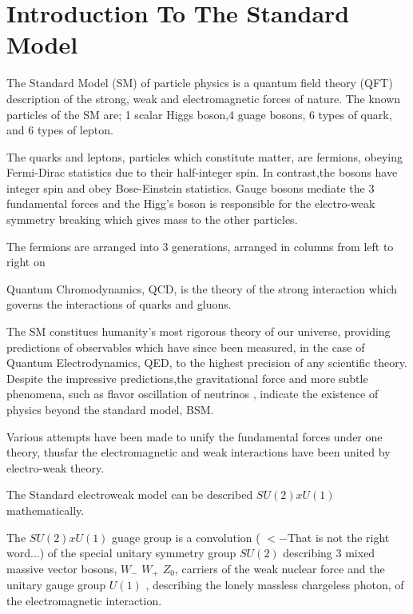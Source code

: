 \section{Introduction To The Standard Model}\label{secSM}



The Standard Model (SM) of particle physics is a quantum field theory (QFT) description of the strong, weak and electromagnetic forces of nature. The known particles of the SM are; 1 scalar Higgs boson,4 guage bosons, 6 types of quark, and 6 types of lepton. 

The quarks and leptons, particles which constitute matter, are fermions, obeying Fermi-Dirac statistics due to their half-integer spin. In contrast,the bosons have integer spin and obey Bose-Einstein statistics. Gauge bosons mediate the 3 fundamental forces and the Higg's boson is responsible for the electro-weak symmetry breaking which gives mass to the other particles\cite{Griffiths:111880}. 

The fermions are arranged into 3 generations, arranged in columns from left to right on \cite{fig:SM}



Quantum Chromodynamics, QCD, is the theory of the strong interaction which governs the interactions of quarks and gluons\cite{Griffiths:111880}.


The SM constitues humanity's most rigorous theory of our universe, providing predictions of observables which have since been measured, in the case of Quantum Electrodynamics, QED, to the highest precision of any scientific theory. Despite the impressive predictions,the gravitational force and more subtle phenomena, such as flavor oscillation of neutrinos \cite{Ashie:2005ik}, indicate the existence of physics beyond the standard model, BSM.

Various attempts have been made to unify the fundamental forces under one theory, thusfar the electromagnetic and weak interactions have been united by electro-weak theory. 

The Standard electroweak model can be described $SU(2) x U(1)$ mathematically.

The  $SU(2) x U(1)$ guage group is a convolution ( $<- $That is not the right word...) of the special unitary symmetry group $SU(2)$ describing 3 mixed massive vector bosons, $W_{-}$ $W_{+}$ $Z_0$, carriers of the weak nuclear force and the unitary gauge group $U(1)$ , describing the lonely massless chargeless photon, of the electromagnetic interaction.

